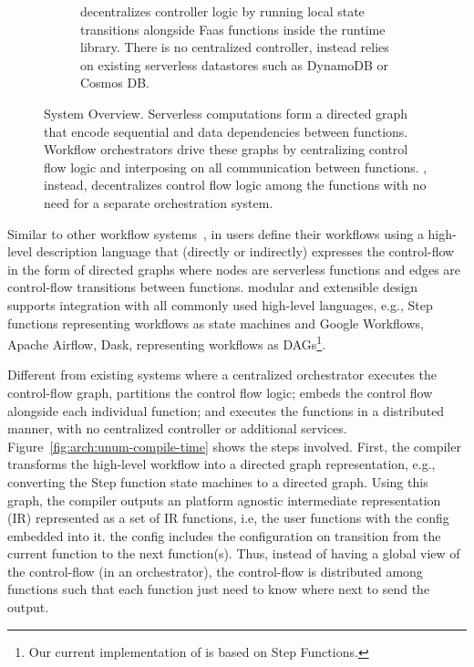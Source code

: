 \begin{figure}[t]
\begin{subfigure}[b]{\columnwidth}
        \caption{\name{} decentralizes controller logic by running local state
                 transitions alongside Faas functions inside the \name{} runtime
                library. There is no centralized controller, instead \name{} relies on existing
                serverless datastores such as DynamoDB or Cosmos DB.}
        \label{fig:arch:unum-runtime}
    \end{subfigure}
    \caption{\name{} System Overview. Serverless computations form a directed
            graph that encode sequential and data dependencies between functions. Workflow
            orchestrators drive these graphs by centralizing control flow logic and
            interposing on all communication between functions. \name{},
            instead, decentralizes control flow logic among the functions with
            no need for a separate orchestration system.}
    \label{fig:arch}
\end{figure}


Similar to other workflow systems~\cite{aws-step-functions, google-workflows,
	google-cloud-composer, gg-atc}, in \name{} users define their workflows using
a high-level description language that (directly or indirectly) expresses the
control-flow in the form of directed graphs  where nodes are serverless
functions and edges are control-flow transitions between functions.  modular and extensible design supports integration with all commonly used high-level languages, e.g., Step functions representing workflows as state machines and Google
Workflows, Apache Airflow, Dask, representing workflows as DAGs\footnote{Our current implementation of \name{} is based on Step Functions.}.
%

Different from existing systems where a centralized orchestrator executes
the control-flow graph, \name{} partitions the control flow logic;  embeds the control flow alongside each individual function; and executes the functions in a distributed manner, with no centralized controller or additional services. Figure~\ref{fig:arch:unum-compile-time} shows the steps involved. First, the  \name{} compiler transforms the high-level workflow into a directed graph representation, e.g., converting the Step function state machines to a directed graph. Using this graph, the compiler outputs an platform agnostic intermediate representation (IR) represented as a set of IR functions, i.e, the user functions with the \name{} config embedded into it. the \name{} config includes the configuration on transition from the current function to the next function(s). Thus, instead of having a global view of the control-flow (in an orchestrator), the control-flow is distributed among functions such that each function just need to know where next to send the output. 

